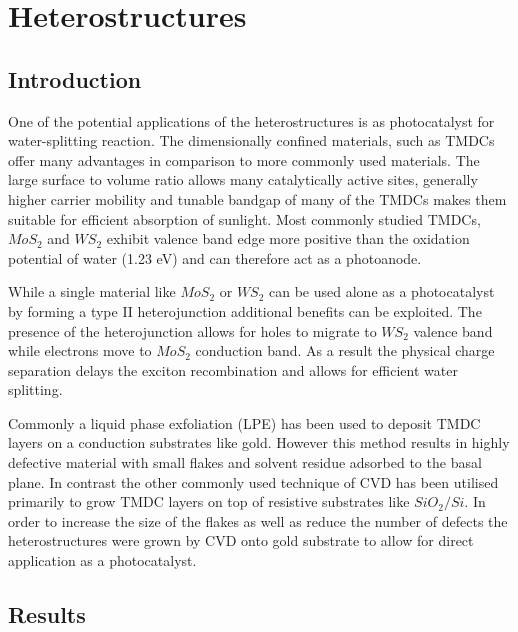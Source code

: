 \section{Heterostructures}

\subsection{Introduction}

One of the potential applications of the heterostructures is as photocatalyst for water-splitting reaction. The dimensionally confined materials, such as TMDCs offer many advantages in comparison to more commonly used materials. The large surface to volume ratio allows many catalytically active sites, generally higher carrier mobility and tunable bandgap of many of the TMDCs makes them suitable for efficient absorption of sunlight. Most commonly studied TMDCs, $MoS_2$ and $WS_2$ exhibit valence band edge more positive than the oxidation potential of water (1.23 eV) and can therefore act as a photoanode. 

While a single material like $MoS_2$ or $WS_2$ can be used alone as a photocatalyst by forming a type II heterojunction additional benefits can be exploited. The presence of the heterojunction allows for holes to migrate to $WS_2$ valence band while electrons move to $MoS_2$ conduction band. As a result the physical charge separation delays the exciton recombination and allows for efficient water splitting. 

Commonly a liquid phase exfoliation (LPE) has been used to deposit TMDC layers on a conduction substrates like gold. However this method results in highly defective material with small flakes and solvent residue adsorbed to the basal plane. In contrast the other commonly used technique of CVD has been utilised primarily to grow TMDC layers on top of resistive substrates like $SiO_2/Si$. In order to increase the size of the flakes as well as reduce the number of defects the heterostructures were grown by CVD onto gold substrate to allow for direct application as a photocatalyst.

\subsection{Results}


